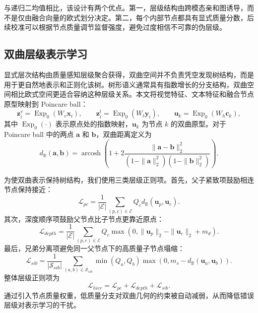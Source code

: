 与递归二均值相比，该设计有两个优点。第一，层级结构由跨模态亲和图诱导，而不是仅由融合向量的欧式划分决定。第二，每个内部节点都具有显式质量分数，后续校准可以根据节点质量调节监督强度，避免过度相信不可靠的伪层级。

\subsection{双曲层级表示学习}

显式层次结构由质量感知层级聚合获得，双曲空间并不负责凭空发现树结构，而是用于更自然地表示和正则化该树。树形语义通常具有指数增长的分支结构，双曲空间相比欧式空间更适合容纳这种层级关系。本文将视觉特征、文本特征和融合节点原型映射到 Poincare ball：
\begin{equation}
    \boldsymbol{z}_i^v
    =
    \operatorname{Exp}_{0}(W_v\boldsymbol{x}_i),
    \qquad
    \boldsymbol{z}_i^t
    =
    \operatorname{Exp}_{0}(W_t\boldsymbol{y}_i),
    \qquad
    \boldsymbol{u}_k
    =
    \operatorname{Exp}_{0}(W_h\boldsymbol{c}_k),
\end{equation}
其中 $\operatorname{Exp}_{0}(\cdot)$ 表示原点处的指数映射，$\boldsymbol{u}_k$ 为节点 $k$ 的双曲原型。对于 Poincare ball 中的两点 $\boldsymbol{a}$ 和 $\boldsymbol{b}$，双曲距离定义为
\begin{equation}
    d_{\mathbb{B}}(\boldsymbol{a},\boldsymbol{b})
    =
    \operatorname{arcosh}
    \left(
    1+
    2\frac{\|\boldsymbol{a}-\boldsymbol{b}\|_2^2}
    {(1-\|\boldsymbol{a}\|_2^2)(1-\|\boldsymbol{b}\|_2^2)}
    \right).
\end{equation}

为使双曲表示保持树结构，我们使用三类层级正则项。首先，父子紧致项鼓励相连节点保持接近：
\begin{equation}
    \mathcal{L}_{pc}
    =
    \frac{1}{|\mathcal{E}|}
    \sum_{(p,c)\in\mathcal{E}}
    Q_c
    d_{\mathbb{B}}(\boldsymbol{u}_p,\boldsymbol{u}_c).
\end{equation}
其次，深度顺序项鼓励父节点比子节点更靠近原点：
\begin{equation}
    \mathcal{L}_{depth}
    =
    \frac{1}{|\mathcal{E}|}
    \sum_{(p,c)\in\mathcal{E}}
    Q_c
    \max(0,\|\boldsymbol{u}_p\|_2-\|\boldsymbol{u}_c\|_2+m_d).
\end{equation}
最后，兄弟分离项避免同一父节点下的高质量子节点塌缩：
\begin{equation}
    \mathcal{L}_{sib}
    =
    \frac{1}{|\mathcal{S}_{sib}|}
    \sum_{(a,b)\in\mathcal{S}_{sib}}
    \min(Q_a,Q_b)
    \max(0,m_s-d_{\mathbb{B}}(\boldsymbol{u}_a,\boldsymbol{u}_b)).
\end{equation}
整体层级正则项为
\begin{equation}
    \mathcal{L}_{hier}
    =
    \mathcal{L}_{pc}
    +
    \mathcal{L}_{depth}
    +
    \mathcal{L}_{sib}.
\end{equation}
通过引入节点质量权重，低质量分支对双曲几何的约束被自动减弱，从而降低错误层级对表示学习的干扰。

